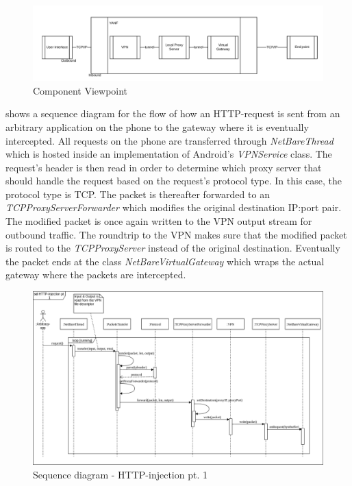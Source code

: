 \documentclass[main.tex]{subfiles}
\begin{document}
\begin{figure}[H]
    \centering
    \includegraphics[width=\textwidth]{Images/Diagrams/ComponentDia.png}
    \caption{Component Viewpoint}
    \label{fig:ccdia}
\end{figure}

 shows a sequence diagram for the flow of how an HTTP-request is sent from an arbitrary application on the phone to the gateway where it is eventually intercepted. All requests on the phone are transferred through \textit{NetBareThread} which is hosted inside an implementation of Android's \textit{VPNService} class. The request's header is then read in order to determine which proxy server that should handle the request based on the request's protocol type. In this case, the protocol type is TCP. The packet is thereafter forwarded to an \textit{TCPProxyServerForwarder} which modifies the original destination IP:port pair. The modified packet is once again written to the VPN output stream for outbound traffic. The roundtrip to the VPN makes sure that the modified packet is routed to the \textit{TCPProxyServer} instead of the original destination. Eventually the packet ends at the class \textit{NetBareVirtualGateway} which wraps the actual gateway where the packets are intercepted.

\begin{figure}[H]
    \centering
    \includegraphics[width=\textwidth]{Images/Diagrams/request-sequence1.png}
    \caption{Sequence diagram - HTTP-injection pt. 1}
    \label{fig:request-sequence1}
\end{figure}
\end{document}
